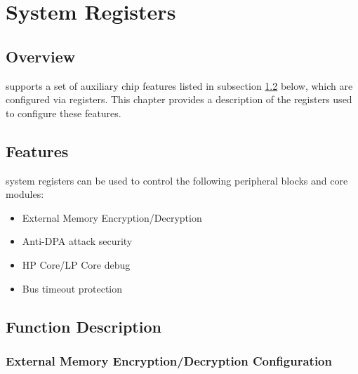 \documentclass[main\_\_EN.tex]{subfiles}
\begin{document}

\ifglobal
\else
    {\let\clearpage\relax \listoftodos}
    \tableofcontents
\fi



\chapter{System Registers}
\label{mod:sysreg}
\hypertarget{sysreg}{}



\section{Overview}

\chipname{} supports a set of auxiliary chip features listed in subsection  \ref{sec:sysreg-features} \textit{} below, which are configured via registers. This chapter provides a description of the registers used to configure these features.

\section{Features}
\label{sec:sysreg-features}

\chipname{} system registers can be used to control the following peripheral blocks and core modules:

\begin{itemize}
    \item External Memory Encryption/Decryption
    \item Anti-DPA attack security
    \item HP Core/LP Core debug
    \item Bus timeout protection
\end{itemize}


\section{Function Description}

\subsection{External Memory Encryption/Decryption Configuration}
\end{document}
